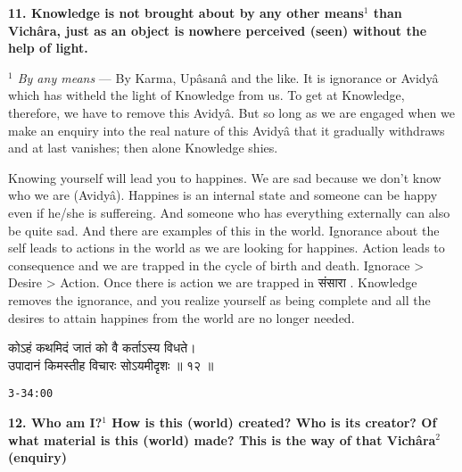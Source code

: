 \documentclass{article}
\begin{document}
\textbf{11. Knowledge is not brought about by any other means$^1$ than Vichâra,
just as an object is nowhere perceived (seen) without the help of light.}

{\small\textit{$^1$ By any means} --- By Karma, Upâsanâ and the like. It is ignorance or Avidyâ which has witheld the light of Knowledge from us. To get at Knowledge, therefore, we have to remove this Avidyâ. But so long as we are engaged when we make an enquiry into the real nature of this Avidyâ that it gradually withdraws and at last vanishes; then alone Knowledge shies.}
\begin{oframed}
Knowing yourself will lead you to happines. We are sad because we don't know
who we are (Avidyâ).  Happines is an internal state and someone can be happy
even if he/she is suffereing. And someone who has everything externally can
also be quite sad. And there are examples of this in the world.  Ignorance
about the self leads to actions in the world as we are looking for happines.
Action leads to consequence and we are trapped in the cycle of birth and death.
Ignorace > Desire > Action. Once there is action we are trapped in 
\texthindi{संसारा}
. Knowledge removes the ignorance, and you realize yourself as being complete
and all the desires to attain happines from the world are no longer needed.
\end{oframed}



\bigskip

\begin{large}
\begin{center}
    \begin{hindi}

	कोऽहं कथमिदं जातं को वै कर्ताऽस्य विधते।\\
    उपादानं किमस्तीह विचारः सोऽयमीदृशः ॥ १२ ॥

    \end{hindi}
\end{center}
\end{large}
\texttt{3-34:00}

\textbf{ 12. Who am I?$^1$ How is this (world) created? Who is its creator? Of
what material is this (world) made? This is the way of that Vichâra$^2$
(enquiry) }
\end{document}
